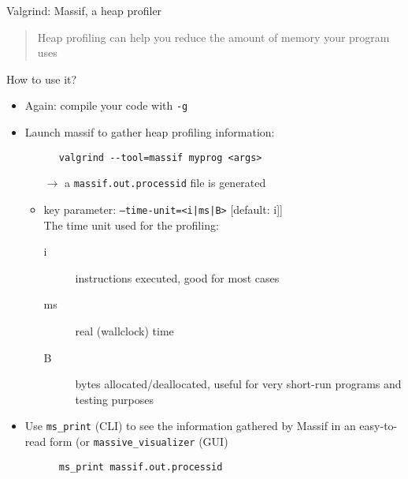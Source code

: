 \documentclass[10pt,xcolor=table]{beamer}
\begin{document}
\begin{frame}[fragile]{Valgrind: Massif, a heap profiler}

  \begin{quote}
    Heap profiling can help you reduce the amount of memory your
    program uses
  \end{quote}

  \pause

  How to use it?
  \begin{itemize}
  \item Again: compile your code with {\tt -g}
  \item Launch massif to gather heap profiling information:
    \begin{lstlisting}
      valgrind --tool=massif myprog <args>
    \end{lstlisting}
    \begin{itemize}
    \item[$\rightarrow$] a {\tt massif.out.processid} file is
      generated
    \item<3>[$\rightarrow$] key parameter: {\tt --time-unit=<i|ms|B>} [default: i]]\\
      The time unit used for the profiling:
      \begin{description}
      \item[i] instructions executed, good for most cases
      \item[ms] real (wallclock) time
      \item[B] bytes allocated/deallocated, useful for very short-run
        programs and testing purposes
      \end{description}
    \end{itemize}
  \item Use {\tt ms\_print} (CLI) to see the information gathered by
    Massif in an easy-to-read form (or {\tt massive\_visualizer} (GUI)
    \begin{lstlisting}
      ms_print massif.out.processid
    \end{lstlisting}
  \end{itemize}

\end{frame}
\end{document}
